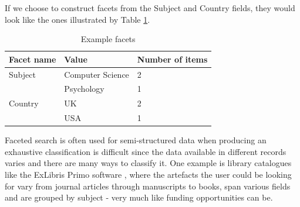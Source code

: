 If we choose to construct facets from the Subject and Country fields, they would look like the ones illustrated by Table \ref{tab:facets-example2}.
\begin{table}[!h]
\centering
\begin{tabular}{l|l|l}
	Facet name & Value & Number of items\\
	\hline
	Subject & Computer Science & 2\\[3pt]
	 & Psychology & 1\\[3pt]
	Country & UK & 2\\[3pt]
	 & USA & 1\\[3pt]
\end{tabular}
\caption{Example facets}
\label{tab:facets-example2}
\end{table}

Faceted search is often used for semi-structured data when producing an exhaustive classification is difficult since the data available in different records varies and there are many ways to classify it. One example is library catalogues like the ExLibris Primo software \cite{primo}, where the artefacts the user could be looking for vary from journal articles through manuscripts to books, span various fields and are grouped by subject - very much like funding opportunities can be.


